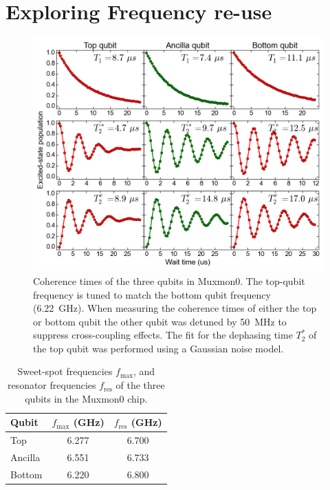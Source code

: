     \section{Exploring Frequency re-use}
      \label{sec:Exploring Frequency re-use}
      \begin{figure}[tb]
        \centering
        \includegraphics[width=\linewidth]{Figures/Exploring frequency re-use/coherence_times.png}
        \caption{Coherence times of the three qubits in Muxmon0. The top-qubit frequency is tuned to match the bottom qubit frequency (\SI{6.22}{\giga \hertz}). When measuring the coherence times of either the top or bottom qubit the other qubit was detuned by \SI{50}{\mega \hertz} to suppress cross-coupling effects. The fit for the dephasing time $T_2^*$ of the top qubit was performed using a Gaussian noise model.}
        \label{fig:coherence times Muxmon0}
      \end{figure}

      \begin{table}
        \begin{tabular}{l c c}
          \toprule
          Qubit  & $f_\text{max}$ (GHz) & $f_\text{res}$ (GHz)\\
          \midrule
          Top    & 6.277                & 6.700 \\
          Ancilla& 6.551                & 6.733 \\
          Bottom & 6.220                & 6.800 \\
          \bottomrule
        \end{tabular}
        \caption{Sweet-spot frequencies $f_\text{max}$, and resonator frequencies $f_\text{res}$ of the three qubits in the Muxmon0 chip.}
        \label{tab:Muxmon0 qubit properties}
      \end{table}


